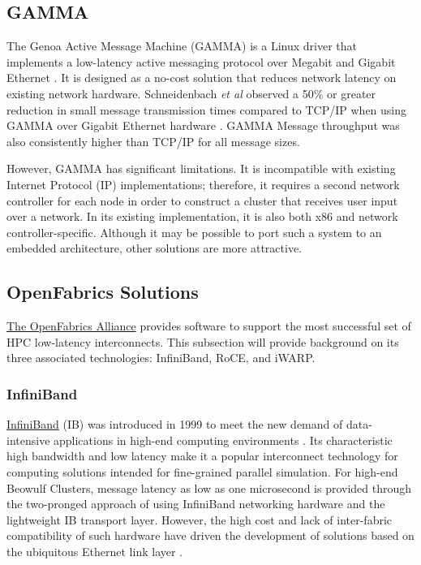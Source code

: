 \documentclass[11pt]{book}
\begin{document}
\subsection{GAMMA}

The Genoa Active Message Machine (GAMMA) is a Linux driver that implements a low-latency
active messaging protocol over Megabit and Gigabit Ethernet \cite{gamma}.  It is designed
as a no-cost solution that reduces network latency on existing network
hardware. Schneidenbach \emph{et al} observed a 50\% or greater reduction in small message
transmission times compared to TCP/IP when using GAMMA over Gigabit Ethernet hardware
\cite{schneidenbach-03}.  GAMMA Message throughput was also consistently higher than
TCP/IP for all message sizes.

However, GAMMA has significant limitations.  It is incompatible with existing Internet
Protocol (IP) implementations; therefore, it requires a second network controller for each
node in order to construct a cluster that receives user input over a network.  In its
existing implementation, it is also both x86 and network controller-specific.  Although it
may be possible to port such a system to an embedded architecture, other solutions are
more attractive.

\subsection{OpenFabrics Solutions}

\href{www.openfabrics.org}{The OpenFabrics Alliance} provides software to support the most
successful set of HPC low-latency interconnects.  This subsection will provide background
on its three associated technologies: InfiniBand, RoCE, and iWARP.

\subsubsection{InfiniBand}

\href {www.infinibandta.org}{InfiniBand} (IB) was introduced in 1999 to meet the new
demand of data-intensive applications in high-end computing environments
\cite{InfiniBandTABase-07}.  Its characteristic high bandwidth and low latency make it a
popular interconnect technology for computing solutions intended for fine-grained parallel
simulation.  For high-end Beowulf Clusters, message latency as low as one microsecond is
provided through the two-pronged approach of using InfiniBand networking hardware and the
lightweight IB transport layer.  However, the high cost and lack of inter-fabric
compatibility of such hardware have driven the development of solutions based on the
ubiquitous Ethernet link layer \cite{roce-announce}.
\end{document}
